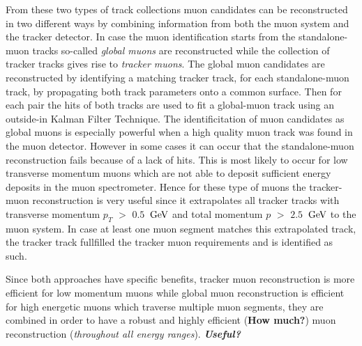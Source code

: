 From these two types of track collections muon candidates can be reconstructed in two different ways by combining information from both the muon system and the tracker detector. In case the muon identification starts from the standalone-muon tracks so-called \textit{global muons} are reconstructed while the collection of tracker tracks gives rise to \textit{tracker muons}.
The global muon candidates are reconstructed by identifying a matching tracker track, for each standalone-muon track, by propagating both track parameters onto a common surface. Then for each pair the hits of both tracks are used to fit a global-muon track using an outside-in Kalman Filter Technique. The identificitation of muon candidates as global muons is especially powerful when a high quality muon track was found in the muon detector. However in some cases it can occur that the standalone-muon reconstruction fails because of a lack of hits. This is most likely to occur for low transverse momentum muons which are not able to deposit sufficient energy deposits in the muon spectrometer. Hence for these type of muons the tracker-muon reconstruction is very useful since it extrapolates all tracker tracks with transverse momentum $p_T$ $>$ $0.5$ $\, \mathrm{GeV}$ and total momentum $p$ $>$ $2.5$ $\, \mathrm{GeV}$ to the muon system. In case at least one muon segment matches this extrapolated track, the tracker track fullfilled the tracker muon requirements and is identified as such.

Since both approaches have specific benefits, tracker muon reconstruction is more efficient for low momentum muons while global muon reconstruction is efficient for high energetic muons which traverse multiple muon segments, they are combined in order to have a robust and highly efficient (\textbf{How much?}) muon reconstruction (\textit{throughout all energy ranges}). \textit{\textbf{Useful?}}
\\

